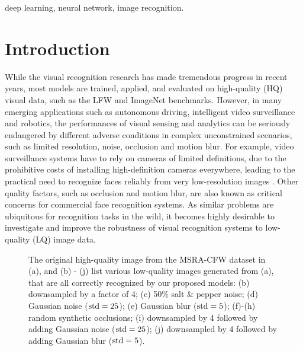 \documentclass[10pt,twocolumn,twoside]{IEEEtran} %
\begin{document}
\begin{IEEEkeywords}
deep learning, neural network, image recognition.
\end{IEEEkeywords}






\IEEEpeerreviewmaketitle

\section{Introduction}\label{sec:intro}%

While the visual recognition research has made tremendous progress in recent years, most models are trained, applied, and evaluated on high-quality (HQ) visual data, such as the LFW \cite{LFW} and ImageNet \cite{Alex} benchmarks. 
However, in many emerging applications such as autonomous driving, intelligent video surveillance and robotics, the performances of visual sensing and analytics can be seriously endangered by different adverse conditions \cite{de2014face} in complex unconstrained scenarios, such as limited resolution, noise, occlusion and motion blur. 
For example, video surveillance systems have to rely on cameras of limited definitions, due to the prohibitive costs of installing high-definition cameras everywhere, leading to the practical need to recognize faces reliably from very low-resolution images \cite{VFR}. 
Other quality factors, such as occlusion and motion blur, are also known as critical concerns for commercial face recognition systems. 
As similar problems are ubiquitous for recognition tasks in the wild, it becomes highly desirable to investigate and improve the robustness of visual recognition systems to low-quality (LQ) image data.

\begin{figure}[t]
	\centering
	\begin{minipage}{0.47\textwidth}
		\end{minipage}
	\caption{The original high-quality image from the MSRA-CFW dataset in (a), and (b) - (j) list various low-quality images generated from (a), that are all correctly recognized by our proposed models: (b) downsampled by a factor of 4; (c) 50\% salt \& pepper noise; (d) Gaussian noise (${\rm std} = 25$); (e) Gaussian blur (${\rm std} = 5$); (f)-(h) random synthetic occlusions; (i) downsampled by 4 followed by adding Gaussian noise (${\rm std} = 25$); (j) downsampled by 4 followed by adding Gaussian blur (${\rm std} = 5$).}
	\label{fig:intro}
\end{figure}
\end{document}
